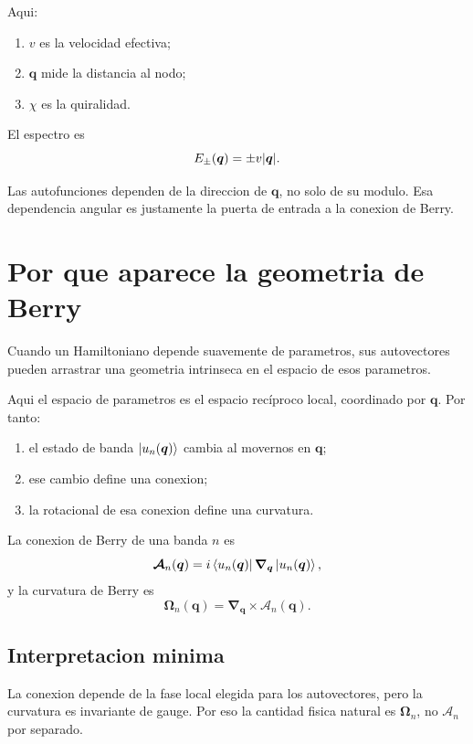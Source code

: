 Aqui:
\begin{enumerate}[label=\arabic*.]
    \item \(v\) es la velocidad efectiva;
    \item \(\bm{q}\) mide la distancia al nodo;
    \item \(\chi\) es la quiralidad.
\end{enumerate}

El espectro es
\begin{equation}
E_\pm(\bm{q})=\pm v\abs{\bm{q}}.
\end{equation}

Las autofunciones dependen de la direccion de \(\bm{q}\), no solo de su modulo. Esa dependencia angular es justamente la puerta de entrada a la conexion de Berry.

\section{Por que aparece la geometria de Berry}
Cuando un Hamiltoniano depende suavemente de parametros, sus autovectores pueden arrastrar una geometria intrinseca en el espacio de esos parametros.

Aqui el espacio de parametros es el espacio recíproco local, coordinado por \(\bm{q}\). Por tanto:
\begin{enumerate}[label=\arabic*.]
    \item el estado de banda \(\ket{u_n(\bm{q})}\) cambia al movernos en \(\bm{q}\);
    \item ese cambio define una conexion;
    \item la rotacional de esa conexion define una curvatura.
\end{enumerate}

La conexion de Berry de una banda \(n\) es
\begin{equation}
\bm{\mathcal{A}}_n(\bm{q})
=
i\bra{u_n(\bm{q})}\bm{\nabla}_{\bm{q}}\ket{u_n(\bm{q})},
\label{c10:eq:berryconn}
\end{equation}
y la curvatura de Berry es
\begin{equation}
\bm{\Omega}_n(\bm{q})
=
\bm{\nabla}_{\bm{q}}\times \bm{\mathcal{A}}_n(\bm{q}).
\label{c10:eq:berrycurv}
\end{equation}

\subsection{Interpretacion minima}
La conexion depende de la fase local elegida para los autovectores, pero la curvatura es invariante de gauge. Por eso la cantidad fisica natural es \(\bm{\Omega}_n\), no \(\bm{\mathcal{A}}_n\) por separado.


